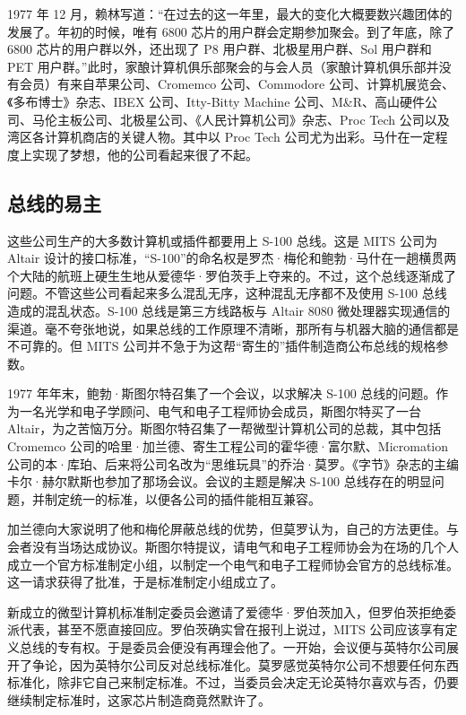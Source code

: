 \documentclass[12pt,UTF8]{ctexbook}
\begin{document}
1977 年 12 月，赖林写道：“在过去的这一年里，最大的变化大概要数兴趣团体的发展了。年初的时候，唯有 6800 芯片的用户群会定期参加聚会。到了年底，除了 6800 芯片的用户群以外，还出现了 P8 用户群、北极星用户群、Sol 用户群和 PET 用户群。”此时，家酿计算机俱乐部聚会的与会人员（家酿计算机俱乐部并没有会员）有来自苹果公司、Cromemco 公司、Commodore 公司、计算机展览会、《多布博士》杂志、IBEX 公司、Itty-Bitty Machine 公司、M\&R、高山硬件公司、马伦主板公司、北极星公司、《人民计算机公司》杂志、Proc Tech 公司以及湾区各计算机商店的关键人物。其中以 Proc Tech 公司尤为出彩。马什在一定程度上实现了梦想，他的公司看起来很了不起。





\subsection{总线的易主}


这些公司生产的大多数计算机或插件都要用上 S-100 总线。这是 MITS 公司为 Altair 设计的接口标准，“S-100”的命名权是罗杰·梅伦和鲍勃·马什在一趟横贯两个大陆的航班上硬生生地从爱德华·罗伯茨手上夺来的。不过，这个总线逐渐成了问题。不管这些公司看起来多么混乱无序，这种混乱无序都不及使用 S-100 总线造成的混乱状态。S-100 总线是第三方线路板与 Altair 8080 微处理器实现通信的渠道。毫不夸张地说，如果总线的工作原理不清晰，那所有与机器大脑的通信都是不可靠的。但 MITS 公司并不急于为这帮“寄生的”插件制造商公布总线的规格参数。

1977 年年末，鲍勃·斯图尔特召集了一个会议，以求解决 S-100 总线的问题。作为一名光学和电子学顾问、电气和电子工程师协会成员，斯图尔特买了一台 Altair，为之苦恼万分。斯图尔特召集了一帮微型计算机公司的总裁，其中包括 Cromemco 公司的哈里·加兰德、寄生工程公司的霍华德·富尔默、Micromation 公司的本·库珀、后来将公司名改为“思维玩具”的乔治·莫罗。《字节》杂志的主编卡尔·赫尔默斯也参加了那场会议。会议的主题是解决 S-100 总线存在的明显问题，并制定统一的标准，以便各公司的插件能相互兼容。

加兰德向大家说明了他和梅伦屏蔽总线的优势，但莫罗认为，自己的方法更佳。与会者没有当场达成协议。斯图尔特提议，请电气和电子工程师协会为在场的几个人成立一个官方标准制定小组，以制定一个电气和电子工程师协会官方的总线标准。这一请求获得了批准，于是标准制定小组成立了。

新成立的微型计算机标准制定委员会邀请了爱德华·罗伯茨加入，但罗伯茨拒绝委派代表，甚至不愿直接回应。罗伯茨确实曾在报刊上说过，MITS 公司应该享有定义总线的专有权。于是委员会便没有再理会他了。一开始，会议便与英特尔公司展开了争论，因为英特尔公司反对总线标准化。莫罗感觉英特尔公司不想要任何东西标准化，除非它自己来制定标准。不过，当委员会决定无论英特尔喜欢与否，仍要继续制定标准时，这家芯片制造商竟然默许了。
\end{document}
